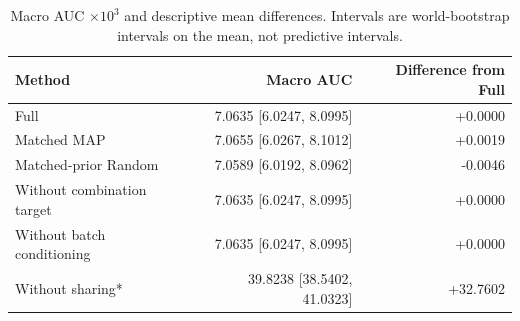 \begin{table}[tbp]
\centering
\caption{Macro AUC $\times10^3$ and descriptive mean differences. Intervals are world-bootstrap intervals on the mean, not predictive intervals.}
\label{tab:macro}
\scriptsize
\setlength{\tabcolsep}{3pt}
\begin{tabular}{lrr}
\toprule
Method & Macro AUC & Difference from Full \\
\midrule
Full & 7.0635 [6.0247, 8.0995] & +0.0000 \\
Matched MAP & 7.0655 [6.0267, 8.1012] & +0.0019 \\
Matched-prior Random & 7.0589 [6.0192, 8.0962] & -0.0046 \\
Without combination target & 7.0635 [6.0247, 8.0995] & +0.0000 \\
Without batch conditioning & 7.0635 [6.0247, 8.0995] & +0.0000 \\
Without sharing* & 39.8238 [38.5402, 41.0323] & +32.7602 \\
\bottomrule
\end{tabular}
\end{table}
